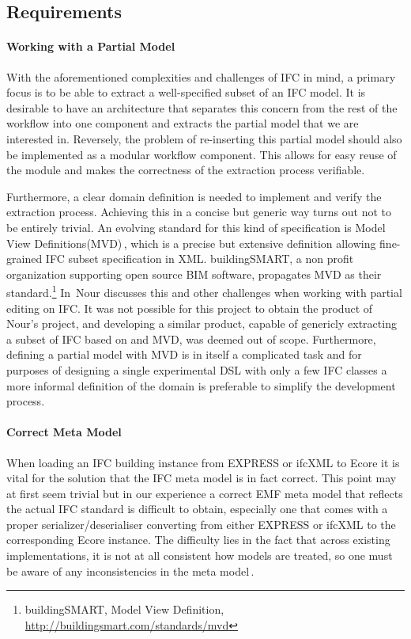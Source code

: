 \subsection{Requirements}
\label{subsec:requirements}
\paragraph{Working with a Partial Model}
With the aforementioned complexities and challenges of IFC in mind, a primary focus is to be able to extract a well-specified subset of an IFC model. It is desirable to have an architecture that separates this concern from the rest of the workflow into one component and extracts the partial model that we are interested in. Reversely, the problem of re-inserting this partial model should also be implemented as a modular workflow component. This allows for easy reuse of the module and makes the correctness of the extraction process verifiable.

Furthermore, a clear domain definition is needed to implement and verify the extraction process. Achieving this in a concise but generic way turns out not to be entirely trivial. An evolving standard for this kind of specification is Model View Definitions(MVD)\,\cite{nour08}, which is a precise but extensive definition allowing fine-grained IFC subset specification in XML. buildingSMART, a non profit organization supporting open source BIM software, propagates MVD as their standard.\footnote{buildingSMART, Model View Definition, \url{http://buildingsmart.com/standards/mvd}} In\,\cite{nour08} Nour discusses this and other challenges when working with partial editing on IFC. It was not possible for this project to obtain the product of Nour's project, and developing a similar product, capable of genericly extracting a subset of IFC based on and MVD, was deemed out of scope. Furthermore, defining a partial model with MVD is in itself a complicated task and for purposes of designing a single experimental DSL with only a few IFC classes a more informal definition of the domain is preferable to simplify the development process.

\paragraph{Correct Meta Model}
When loading an IFC building instance from EXPRESS or ifcXML to Ecore it is vital for the solution that the IFC meta model is in fact correct. This point may at first seem trivial but in our experience a correct EMF meta model that reflects the actual IFC standard is difficult to obtain, especially one that comes with a proper serializer/deserialiser converting from either EXPRESS or ifcXML to the corresponding Ecore instance. The difficulty lies in the fact that across existing implementations, it is not at all consistent how models are treated, so one must be aware of any inconsistencies in the meta model\,\cite[pp. 4]{quteprints37725}. %

